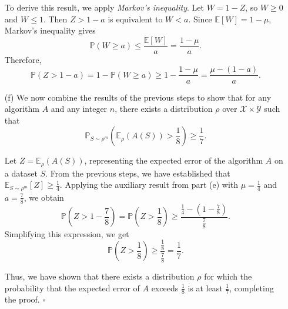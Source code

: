 \documentclass{article}
\begin{document}
\begin{itemize}
    To derive this result, we apply \textit{Markov's inequality}. Let \( W = 1 - Z \), so \( W \ge 0 \) and \( W \le 1 \). Then \( Z > 1 - a \) is equivalent to \( W < a \). Since \( \mathbb{E}[W] = 1 - \mu \), Markov’s inequality gives
    \[
    \mathbb{P}(W \ge a) \le \frac{\mathbb{E}[W]}{a} = \frac{1 - \mu}{a}.
    \]
    Therefore,
    \[
    \mathbb{P}(Z > 1 - a) = 1 - \mathbb{P}(W \ge a) \ge 1 - \frac{1 - \mu}{a} = \frac{\mu - (1 - a)}{a}.
    \]

    \item[(f)] We now combine the results of the previous steps to show that for any algorithm \( A \) and any integer \( n \), there exists a distribution \( \rho \) over \( \mathcal{X} \times \mathcal{Y} \) such that
    \[
    \mathbb{P}_{S \sim \rho^m}\left( \mathbb{E}_\rho(A(S)) > \frac{1}{8} \right) \ge \frac{1}{7}.
    \]
    
    Let \( Z = \mathbb{E}_\rho(A(S)) \), representing the expected error of the algorithm \( A \) on a dataset \( S \). From the previous steps, we have established that \( \mathbb{E}_{S \sim \rho^m}[Z] \ge \frac{1}{4} \). Applying the auxiliary result from part (e) with \( \mu = \frac{1}{4} \) and \( a = \frac{7}{8} \), we obtain
    \[
    \mathbb{P}\left(Z > 1 - \frac{7}{8}\right) = \mathbb{P}\left(Z > \frac{1}{8}\right) \ge \frac{\frac{1}{4} - \left(1 - \frac{7}{8}\right)}{\frac{7}{8}}.
    \]
    Simplifying this expression, we get
    \[
    \mathbb{P}\left(Z > \frac{1}{8}\right) \ge \frac{\frac{1}{8}}{\frac{7}{8}} = \frac{1}{7}.
    \]
    
    Thus, we have shown that there exists a distribution \( \rho \) for which the probability that the expected error of \( A \) exceeds \( \frac{1}{8} \) is at least \( \frac{1}{7} \), completing the proof. \(\square\)
    
\end{itemize}
\end{document}
